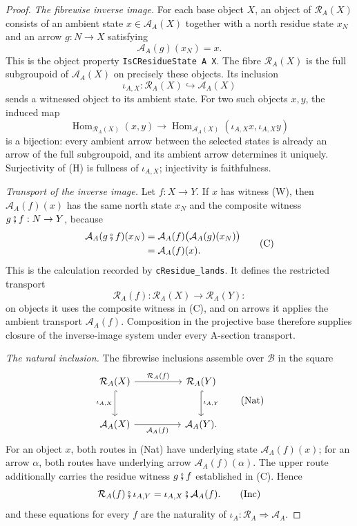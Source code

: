 \documentclass[11pt]{article}
\theoremstyle{plain}
\theoremstyle{definition}
\theoremstyle{remark}
\begin{document}
\begin{proof}
\emph{The fibrewise inverse image.}
For each base object $X$, an object of $\mathcal R_A(X)$ consists of an ambient state
$x\in\mathcal A_A(X)$ together with a north residue state $x_N$ and an arrow
$g:N\to X$ satisfying
\[
  \mathcal A_A(g)(x_N)=x.                                      \tag{W}
\]
This is the object property \texttt{IsCResidueState\,A\,X}.  The fibre
$\mathcal R_A(X)$ is the full subgroupoid of $\mathcal A_A(X)$ on precisely these objects.
Its inclusion
\[
  \iota_{A,X}:\mathcal R_A(X)\hookrightarrow\mathcal A_A(X)
\]
sends a witnessed object to its ambient state.  For two such objects $x,y$, the induced map
\[
  \operatorname{Hom}_{\mathcal R_A(X)}(x,y)
  \longrightarrow
  \operatorname{Hom}_{\mathcal A_A(X)}
    (\iota_{A,X}x,\iota_{A,X}y)                       \tag{H}
\]
is a bijection: every ambient arrow between the selected states is already an arrow of the full
subgroupoid, and its ambient arrow determines it uniquely.  Surjectivity of \textup{(H)} is
fullness of $\iota_{A,X}$; injectivity is faithfulness.

\emph{Transport of the inverse image.}
Let $f:X\to Y$.  If $x$ has witness \textup{(W)}, then $\mathcal A_A(f)(x)$ has the same north state
$x_N$ and the composite witness $g\fatsemi f:N\to Y$, because
\[
\begin{aligned}
  \mathcal A_A(g\fatsemi f)(x_N)
    &=\mathcal A_A(f)\bigl(\mathcal A_A(g)(x_N)\bigr)\\
    &=\mathcal A_A(f)(x).
\end{aligned}                                         \tag{C}
\]
This is the calculation recorded by \texttt{cResidue\_lands}.  It defines the restricted
transport
\[
  \mathcal R_A(f):\mathcal R_A(X)\longrightarrow\mathcal R_A(Y):
\]
on objects it uses the composite witness in \textup{(C)}, and on arrows it applies the ambient
transport $\mathcal A_A(f)$.  Composition in the projective base therefore supplies closure of the
inverse-image system under every A-section transport.

\emph{The natural inclusion.}
The fibrewise inclusions assemble over $\mathcal B$ in the square
\[
\begin{tikzcd}[column sep=huge,row sep=large]
\mathcal R_A(X) \arrow[r,"\mathcal R_A(f)"] \arrow[d,hook,"\iota_{A,X}"'] &
\mathcal R_A(Y) \arrow[d,hook,"\iota_{A,Y}"]\\
\mathcal A_A(X) \arrow[r,"\mathcal A_A(f)"'] & \mathcal A_A(Y).
\end{tikzcd}                                           \tag{Nat}
\]
For an object $x$, both routes in \textup{(Nat)} have underlying state $\mathcal A_A(f)(x)$; for an arrow
$\alpha$, both routes have underlying arrow $\mathcal A_A(f)(\alpha)$.  The upper route additionally
carries the residue witness $g\fatsemi f$ established in \textup{(C)}.  Hence
\[
  \mathcal R_A(f)\fatsemi \iota_{A,Y}
  =\iota_{A,X}\fatsemi \mathcal A_A(f).                    \tag{Inc}
\]
and these equations for every $f$ are the naturality of
$\iota_A:\mathcal R_A\Rightarrow\mathcal A_A$.


\end{proof}
\end{document}
